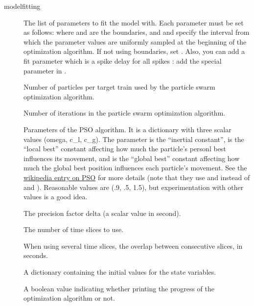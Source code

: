 \documentclass[letterpaper,10pt,english]{manual}
\begin{document}
\begin{funcdesc}{modelfitting}
\begin{description}
\item[] \leavevmode
The list of parameters to fit the model with. Each parameter must be set as follows:
where  and  are the boundaries, and  and 
specify the interval from which the parameter values are uniformly sampled at
the beginning of the optimization algorithm.
If not using boundaries, set .
Also, you can add a fit parameter which is a spike delay for all spikes :
add the special parameter  in .

\item[] \leavevmode
Number of particles per target train used by the particle swarm optimization algorithm.

\item[] \leavevmode
Number of iterations in the particle swarm optimization algorithm.

\item[] \leavevmode
Parameters of the PSO algorithm. It is a dictionary with three scalar values (omega, c\_l, c\_g).
The parameter  is the ``inertial constant'',  is the ``local best''
constant affecting how much the particle's personl best influences its movement, and
 is the ``global best'' constant affecting how much the global best
position influences each particle's movement. See the
\href{http://en.wikipedia.org/wiki/Particle\_swarm\_optimization}{wikipedia entry on PSO}
for more details (note that they use  and  instead of 
and ). Reasonable values are (.9, .5, 1.5), but experimentation
with other values is a good idea.

\item[] \leavevmode
The precision factor delta (a scalar value in second).

\item[] \leavevmode
The number of time slices to use.

\item[] \leavevmode
When using several time slices, the overlap between consecutive slices, in seconds.

\item[] \leavevmode
A dictionary containing the initial values for the state variables.

\item[] \leavevmode
A boolean value indicating whether printing the progress of the optimization algorithm or not.


\end{description}
\end{funcdesc}
\end{document}
